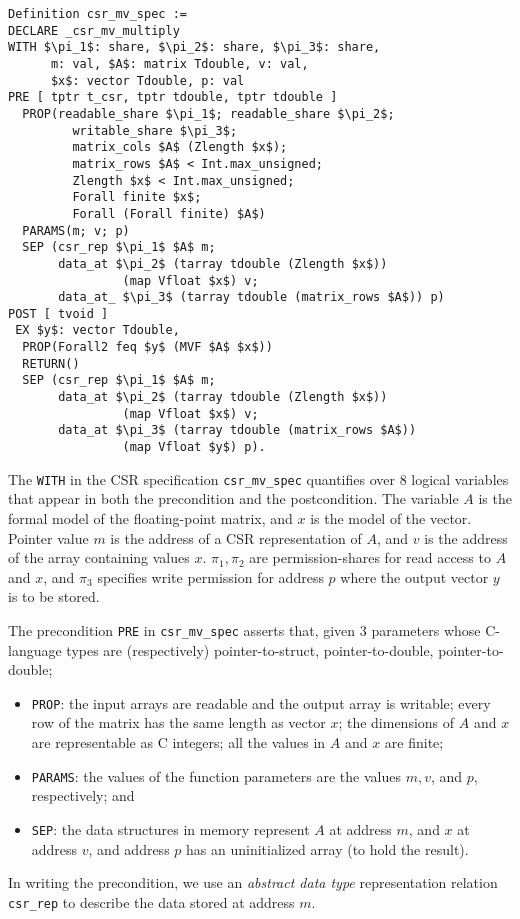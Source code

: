 \begin{lstlisting}[float,label=funspec,captionpos=b,caption=Function specification
for CSR matrix-vector multiply]
Definition csr_mv_spec :=
DECLARE _csr_mv_multiply
WITH $\pi_1$: share, $\pi_2$: share, $\pi_3$: share,
      m: val, $A$: matrix Tdouble, v: val, 
      $x$: vector Tdouble, p: val
PRE [ tptr t_csr, tptr tdouble, tptr tdouble ]
  PROP(readable_share $\pi_1$; readable_share $\pi_2$; 
         writable_share $\pi_3$;
         matrix_cols $A$ (Zlength $x$);
         matrix_rows $A$ < Int.max_unsigned;
         Zlength $x$ < Int.max_unsigned;
         Forall finite $x$;
         Forall (Forall finite) $A$)
  PARAMS(m; v; p)
  SEP (csr_rep $\pi_1$ $A$ m;
       data_at $\pi_2$ (tarray tdouble (Zlength $x$)) 
				(map Vfloat $x$) v; 
       data_at_ $\pi_3$ (tarray tdouble (matrix_rows $A$)) p)
POST [ tvoid ]
 EX $y$: vector Tdouble,
  PROP(Forall2 feq $y$ (MVF $A$ $x$)) 
  RETURN()
  SEP (csr_rep $\pi_1$ $A$ m;
       data_at $\pi_2$ (tarray tdouble (Zlength $x$)) 
				(map Vfloat $x$) v; 
       data_at $\pi_3$ (tarray tdouble (matrix_rows $A$)) 
				(map Vfloat $y$) p).
\end{lstlisting}

The  \lstinline{WITH} in the CSR specification \lstinline{csr_mv_spec} quantifies over 8 logical variables that appear in both the precondition and the postcondition.
The variable $A$ is the formal model of the floating-point matrix, and $x$ is the model of the vector.
Pointer value $m$ is the address of a CSR representation of
$A$, and $v$ is the address of the array containing values $x$.
$\pi_1,\pi_2$ are permission-shares
for read access to $A$ and $x$, and $\pi_3$ specifies write
permission for address $p$ where the output vector $y$ is to be
stored.

The precondition \lstinline{PRE} in \lstinline{csr_mv_spec} asserts that,
  given 3 parameters whose
C-language types are (respectively) pointer-to-struct,
pointer-to-double,
pointer-to-double;
\begin{itemize}
\item \lstinline{PROP}: the input arrays
  are readable and the output array is writable;
every row of the matrix has the same length as vector
$x$; the dimensions of $A$ and $x$ are representable as C
integers; all the values in $A$ and $x$ are finite;
\item \lstinline{PARAMS}:  the values of the function
parameters are the values $m,v$, and $p$, respectively; and
\item \lstinline{SEP}: the data structures in memory represent $A$ at address $m$,
  and $x$ at address $v$,
and address $p$ has an uninitialized array (to hold the
result).\end{itemize}
In writing the precondition, we use an \emph{abstract data
type} representation relation \lstinline{csr_rep}
to describe the data stored at address $m$.

